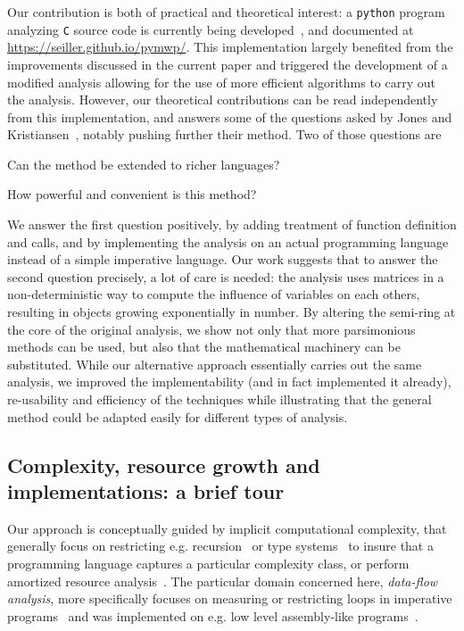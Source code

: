 \documentclass[runningheads]{llncs}
\makeatletter
\newcommand*{\eg}{e.g.\@\xspace}
\makeatother
\begin{document}
Our contribution is both of practical and theoretical interest: a \texttt{python} program analyzing \texttt{C} source code is currently being developed~\cite{Aubert2021f}, and documented at \url{https://seiller.github.io/pymwp/}.
This implementation largely benefited from the improvements discussed in the current paper and triggered the development of a modified analysis allowing for the use of more efficient algorithms to carry out the analysis.
However, our theoretical contributions can be read independently from this implementation, and answers some of the questions asked by Jones and Kristiansen~\cite[Section 1.2]{Jones2009}, notably pushing further their method.
Two of those questions are
\begin{enumerate*}
	\item Can the method be extended to richer languages?
	\item How powerful and convenient is this method?
\end{enumerate*}
We answer the first question positively, by adding treatment of function
definition and calls, and by implementing the analysis on an actual programming
language instead of a simple imperative language.
Our work suggests that to answer the second question precisely, a lot of care is needed: the analysis uses matrices in a non-deterministic way to compute the influence of variables on each others, resulting in objects growing exponentially in number.
By altering the semi-ring at the core of the original analysis, we show not only that more parsimonious methods can be used, but also that the mathematical machinery can be substituted.
While our alternative approach essentially carries out the same analysis, we improved the implementability (and in fact implemented it already), re-usability and efficiency of the techniques while illustrating that the general method could be adapted easily for different types of analysis.

\subsection{Complexity, resource growth and implementations: a brief tour}

Our approach is conceptually guided by implicit computational complexity, that generally focus on restricting \eg recursion~\cite{Bellantoni1992,Leivant1993} or type systems~\cite{Baillot2004,Lafont2004} to insure that a programming language captures a particular complexity class, or perform amortized resource analysis~\cite{Hofmann2015b}.
The particular domain concerned here, \emph{data-flow analysis}, more specifically focuses on measuring or restricting loops in imperative programs~\cite{Jones2009,Kristiansen2004,Niggl2006} and was implemented on \eg low level assembly-like programs~\cite{Moyen2009}.
\end{document}

